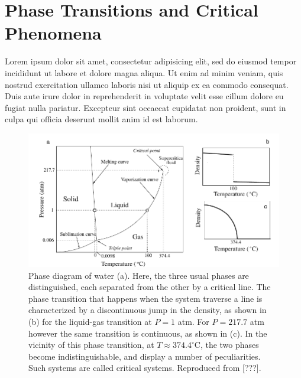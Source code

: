 \chapter{Phase Transitions and Critical Phenomena}
\label{ch2-crit}



Lorem ipsum dolor sit amet, consectetur adipisicing elit, sed do eiusmod tempor
incididunt ut labore et dolore magna aliqua. Ut enim ad minim veniam, quis
nostrud exercitation ullamco laboris nisi ut aliquip ex ea commodo consequat.
Duis aute irure dolor in reprehenderit in voluptate velit esse cillum dolore eu
fugiat nulla pariatur. Excepteur sint occaecat cupidatat non proident, sunt in
culpa qui officia deserunt mollit anim id est laborum.


\begin{figure}
\begin{center}
    \includegraphics[scale=1.0]{chapters/ch2-crit/figs/water}
\end{center}
\caption{Phase diagram of water (a). Here, the three usual phases are
    distinguished, each separated from the other by a critical line. The
    phase transition that happens when the system traverse a line is
    characterized by a discontinuous jump in the density, as shown in (b) for
    the liquid-gas transition at $P=1$ atm. For $P=217.7$ atm however the same
    transition is continuous, as shown in (c). In the vicinity of this phase
    transition, at $T\approx374.4^\circ$C, the two phases become
    indistinguishable, and display a number of peculiarities. Such systems are
    called critical systems. Reproduced from [???].}
\label{fig:bacteria}
\end{figure}

